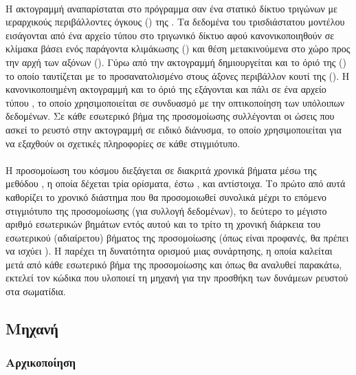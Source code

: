 \paragraph{} Η ακτογραμμή αναπαρίσταται στο πρόγραμμα σαν ένα στατικό δίκτυο τριγώνων με
ιεραρχικούς περιβάλλοντες όγκους () της . Τα δεδομένα
του τρισδιάστατου μοντέλου εισάγονται από ένα αρχείο τύπου  στο τριγωνικό δίκτυο
αφού κανονικοποιηθούν σε κλίμακα βάσει ενός παράγοντα κλιμάκωσης ()
και θέση μετακινούμενα στο χώρο προς την αρχή των αξόνων (). Γύρω από την
ακτογραμμή δημιουργείται και το όριό της () το οποίο ταυτίζεται με
το προσανατολισμένο στους άξονες περιβάλλον κουτί της (). Η κανονικοποιημένη
ακτογραμμή και το όριό της εξάγονται και πάλι σε ένα αρχείο τύπου , το οποίο
χρησιμοποιείται σε συνδυασμό με την οπτικοποίηση των υπόλοιπων δεδομένων. Σε κάθε
εσωτερικό βήμα της προσομοίωσης συλλέγονται οι ώσεις που ασκεί το ρευστό στην ακτογραμμή
σε ειδικό διάνυσμα, το οποίο χρησιμοποιείται για να εξαχθούν οι σχετικές πληροφορίες σε
κάθε στιγμιότυπο.

\paragraph{} Η προσομοίωση του κόσμου διεξάγεται σε διακριτά χρονικά βήματα μέσω της
μεθόδου , η οποία δέχεται τρία ορίσματα, έστω ,  και
 αντίστοιχα. Το πρώτο από αυτά καθορίζει το χρονικό διάστημα που θα προσομοιωθεί
συνολικά μέχρι το επόμενο στιγμιότυπο της προσομοίωσης (για συλλογή δεδομένων), το δεύτερο
το μέγιστο αριθμό εσωτερικών βημάτων εντός αυτού και το τρίτο τη χρονική διάρκεια του
εσωτερικού (αδιαίρετου) βήματος της προσομοίωσης (όπως είναι προφανές, θα πρέπει να ισχύει
). Η  παρέχει τη δυνατότητα ορισμού μιας 
συνάρτησης, η οποία καλείται μετά από κάθε εσωτερικό βήμα της προσομοίωσης και όπως θα
αναλυθεί παρακάτω, εκτελεί τον κώδικα που υλοποιεί τη μηχανή  για την προσθήκη
των δυνάμεων ρευστού στα σωματίδια.

\subsection{\texorpdfstring{Μηχανή }{}}
\subsubsection{Αρχικοποίηση}
\label{sssec:fluid-init}
